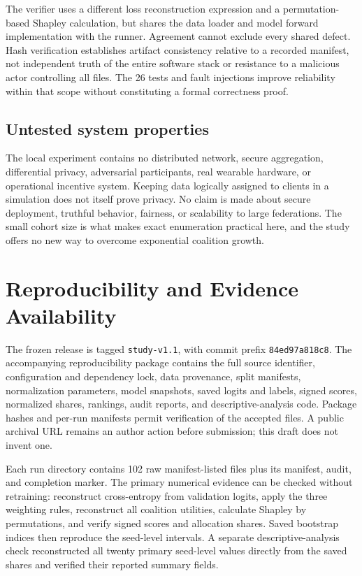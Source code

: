 \documentclass[conference,letterpaper]{IEEEtran}
\begin{document}
The verifier uses a different loss reconstruction expression and a permutation-based Shapley calculation, but shares the data loader and model forward implementation with the runner. Agreement cannot exclude every shared defect. Hash verification establishes artifact consistency relative to a recorded manifest, not independent truth of the entire software stack or resistance to a malicious actor controlling all files. The 26 tests and fault injections improve reliability within that scope without constituting a formal correctness proof.

\subsection{Untested system properties}
The local experiment contains no distributed network, secure aggregation, differential privacy, adversarial participants, real wearable hardware, or operational incentive system. Keeping data logically assigned to clients in a simulation does not itself prove privacy. No claim is made about secure deployment, truthful behavior, fairness, or scalability to large federations. The small cohort size is what makes exact enumeration practical here, and the study offers no new way to overcome exponential coalition growth.

\section{Reproducibility and Evidence Availability}
The frozen release is tagged \texttt{study-v1.1}, with commit prefix \texttt{84ed97a818c8}. The accompanying reproducibility package contains the full source identifier, configuration and dependency lock, data provenance, split manifests, normalization parameters, model snapshots, saved logits and labels, signed scores, normalized shares, rankings, audit reports, and descriptive-analysis code. Package hashes and per-run manifests permit verification of the accepted files. A public archival URL remains an author action before submission; this draft does not invent one.

Each run directory contains 102 raw manifest-listed files plus its manifest, audit, and completion marker. The primary numerical evidence can be checked without retraining: reconstruct cross-entropy from validation logits, apply the three weighting rules, reconstruct all coalition utilities, calculate Shapley by permutations, and verify signed scores and allocation shares. Saved bootstrap indices then reproduce the seed-level intervals. A separate descriptive-analysis check reconstructed all twenty primary seed-level values directly from the saved shares and verified their reported summary fields.
\end{document}
